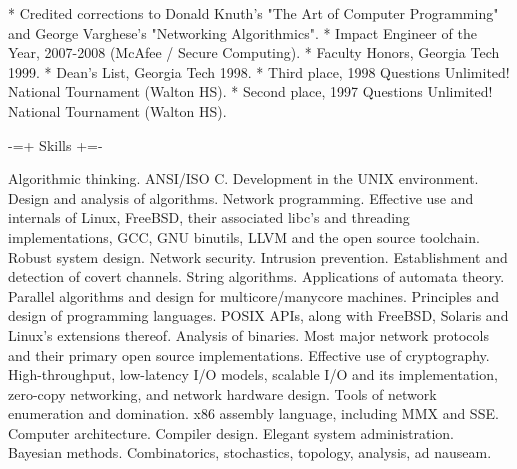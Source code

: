 * Credited corrections to Donald Knuth's "The Art of Computer Programming"
   and George Varghese's "Networking Algorithmics".
* Impact Engineer of the Year, 2007-2008 (McAfee / Secure Computing).
* Faculty Honors, Georgia Tech 1999.
* Dean's List, Georgia Tech 1998.
* Third place, 1998 Questions Unlimited! National Tournament (Walton HS).
* Second place, 1997 Questions Unlimited! National Tournament (Walton HS).

  -=+ Skills +=-

Algorithmic thinking. ANSI/ISO C. Development in the UNIX environment. Design
and analysis of algorithms. Network programming. Effective use and internals
of Linux, FreeBSD, their associated libc's and threading implementations,
GCC, GNU binutils, LLVM and the open source toolchain. Robust system design.
Network security. Intrusion prevention. Establishment and detection of covert
channels. String algorithms. Applications of automata theory. Parallel
algorithms and design for multicore/manycore machines. Principles and design
of programming languages. POSIX APIs, along with FreeBSD, Solaris and Linux's
extensions thereof. Analysis of binaries. Most major network protocols and
their primary open source implementations. Effective use of cryptography.
High-throughput, low-latency I/O models, scalable I/O and its implementation,
zero-copy networking, and network hardware design. Tools of network
enumeration and domination. x86 assembly language, including MMX and SSE.
Computer architecture. Compiler design. Elegant system administration.
Bayesian methods. Combinatorics, stochastics, topology, analysis, ad nauseam.

